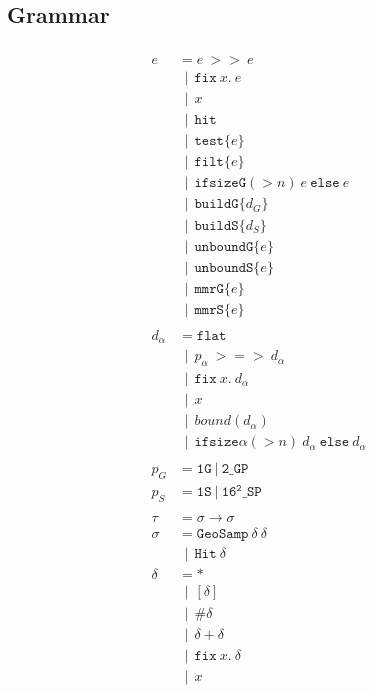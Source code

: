 \documentclass{article}
\newcommand {\gbar} {~~|~~}
\newcommand {\chain}{\mathtt{>>}}
\newcommand {\rightFish}{\mathtt{>=>}}
\newcommand {\fix}{\mathtt{fix}}
\newcommand {\test}{\mathtt{test}}
\newcommand {\filt}{\mathtt{filt}}
\newcommand {\isect}{\mathtt{hit}}
\newcommand {\buildG}{\mathtt{buildG}}
\newcommand {\buildS}{\mathtt{buildS}}
\newcommand {\unboundG}{\mathtt{unboundG}}
\newcommand {\unboundS}{\mathtt{unboundS}}
\newcommand {\mmrG}{\mathtt{mmrG}}
\newcommand {\mmrS}{\mathtt{mmrS}}
\newcommand {\oneS}{\mathtt{1S}}
\newcommand {\oneG}{\mathtt{1G}}
\newcommand {\flatD}{\mathtt{flat}}
\newcommand {\sampP}{\mathtt{16^2\_SP}}
\newcommand {\twoGP}{\mathtt{2\_GP}}
\newcommand {\geosamp}{\mathtt{GeoSamp}}
\newcommand {\hit}{\mathtt{Hit}}
\newcommand {\bound}{\mathit{bound}}
\begin{document}
\subsection{Grammar}
\begin{align*}
\\
e &= e~\chain~e \\
&\gbar \fix~x.~e \\
&\gbar x \\
&\gbar \isect \\
&\gbar \test \{ e \} \\
&\gbar \filt \{ e \} \\
&\gbar \mathtt{ifsizeG}(>n)~e \mathtt{~else~} e \\
&\gbar \buildG \{ d_G \} \\
&\gbar \buildS \{ d_S \} \\
&\gbar \unboundG \{ e \} \\
&\gbar \unboundS \{ e \} \\
&\gbar \mmrG \{ e \} \\
&\gbar \mmrS \{ e \} \\
\\
d_\alpha &= \flatD \\
&\gbar p_\alpha~\rightFish~d_\alpha \\
&\gbar \fix~x.~d_\alpha \\
&\gbar x \\
&\gbar \bound (d_\alpha) \\
&\gbar \mathtt{ifsize\alpha}(>n)~d_\alpha \mathtt{~else~} d_\alpha \\
\\
p_G &= \oneG~|~\twoGP \\
p_S &= \oneS~|~\sampP \\
\\
\tau &= \sigma \to \sigma \\
\sigma &= \geosamp~\delta~\delta \\
&\gbar \hit~\delta \\
\delta &= * \\
&\gbar [\delta] \\
&\gbar \# \delta \\
&\gbar \delta + \delta \\
&\gbar \fix~x.~\delta \\
&\gbar x \\
\end{align*}
\end{document}
